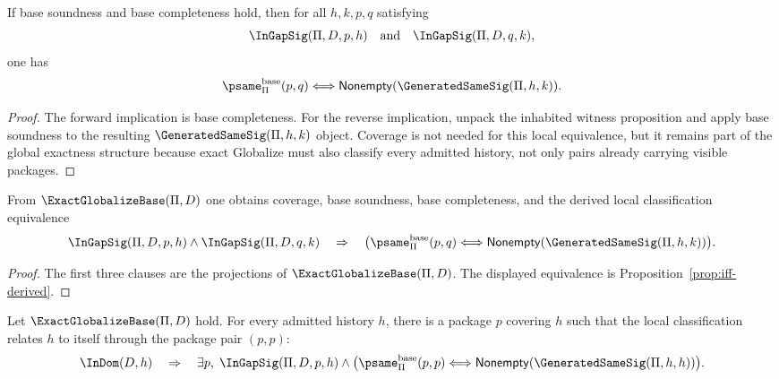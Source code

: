 \begin{proposition}
\label{prop:iff-derived}
If base soundness and base completeness hold, then for all $h,k,p,q$ satisfying
$$
  \InGapSig(\Pi,D,p,h)
  \quad\text{and}\quad
  \InGapSig(\Pi,D,q,k),
$$
one has
$$
  \psame_{\Pi}^{\mathrm{base}}(p,q)\Longleftrightarrow \mathsf{Nonempty}(\GeneratedSameSig(\Pi,h,k)).
$$
\end{proposition}

\begin{proof}
The forward implication is base completeness. For the reverse implication, unpack the inhabited witness proposition and apply base soundness to the resulting $\GeneratedSameSig(\Pi,h,k)$ object. Coverage is not needed for this local equivalence, but it remains part of the global exactness structure because exact Globalize must also classify every admitted history, not only pairs already carrying visible packages.
\end{proof}

\begin{corollary}
\label{cor:exact-globalize-projections-and-classification}
From \(\ExactGlobalizeBase(\Pi,D)\) one obtains coverage, base soundness, base completeness, and the derived local classification equivalence
$$
  \InGapSig(\Pi,D,p,h)\wedge\InGapSig(\Pi,D,q,k)
  \quad\Rightarrow\quad
  \bigl(\psame_{\Pi}^{\mathrm{base}}(p,q)\Longleftrightarrow \mathsf{Nonempty}(\GeneratedSameSig(\Pi,h,k))\bigr).
$$
\end{corollary}

\begin{proof}
The first three clauses are the projections of \(\ExactGlobalizeBase(\Pi,D)\). The displayed equivalence is Proposition~\ref{prop:iff-derived}.
\end{proof}

\begin{theorem}
\label{thm:exact-globalize-base-self-covered-classification}
Let $\ExactGlobalizeBase(\Pi,D)$ hold. For every admitted history $h$, there is a package $p$ covering $h$ such that the local classification relates $h$ to itself through the package pair $(p,p)$:
$$
  \InDom(D,h)
  \quad\Rightarrow\quad
  \exists p,\;
    \InGapSig(\Pi,D,p,h)
    \wedge
    \bigl(\psame_{\Pi}^{\mathrm{base}}(p,p)\Longleftrightarrow \mathsf{Nonempty}(\GeneratedSameSig(\Pi,h,h))\bigr).
$$
\end{theorem}

